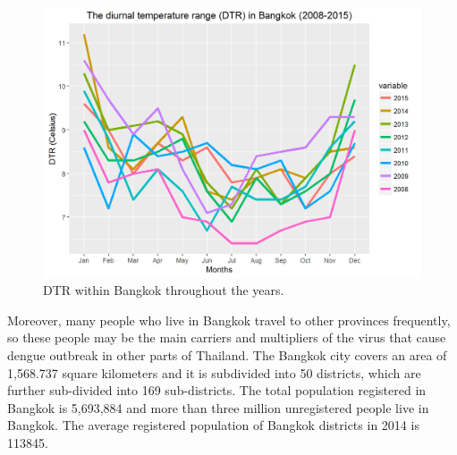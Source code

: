 \documentclass{bmcart}
\begin{document}
\begin{figure}[htbp]
	\begin{center}
		\includegraphics[width= 1.0\textwidth]{2-AvgMonthlyDTR}
		\caption{DTR within Bangkok throughout the years.}
		\label{figure-avg_temp_bangkok}
	\end{center}
\end{figure}


Moreover, many people who live in Bangkok travel to other provinces frequently, so these people may be the main carriers and multipliers of the virus that cause dengue outbreak in other parts of Thailand. The Bangkok city covers an area of 1,568.737 square kilometers and it is subdivided into 50 districts, which are further sub-divided into 169 sub-districts. The total population registered in Bangkok is 5,693,884 and more than three million unregistered people live in Bangkok. The average registered population of Bangkok districts in 2014 is 113845. 



\end{document}
